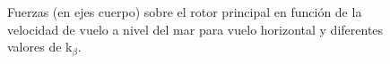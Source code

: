\begin{figure}
	\centering
	\caption{Fuerzas (en ejes cuerpo) sobre el rotor principal en función de la velocidad de vuelo a nivel del mar para vuelo horizontal y diferentes valores de k$_\beta$.}
	\label{FRPkbeta}
\end{figure}

